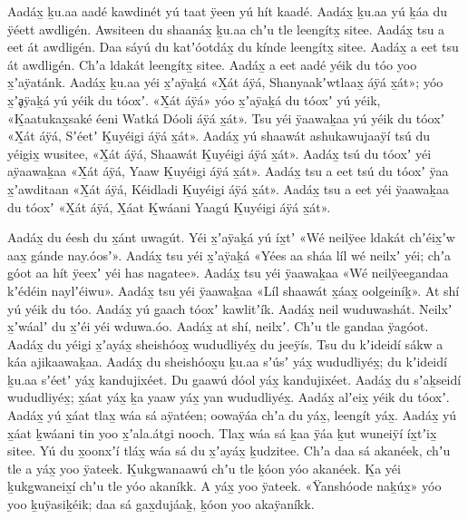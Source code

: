 \begin{pairs}
\begin{Leftside}
\pstart
{}Aadáx̱ ḵu.aa aadé kawdinét yú taat ÿeen yú hít kaadé.
\hspace{-0.5ex}Aadáx̱ ḵu.aa yú ḵáa du ÿéett aw\-dlig̱én.
\hspace{-0.5ex}Awsiteen du shaanáx̱ ḵu.aa chʼu tle leengítx̱ sitee.
\hspace{-0.5ex}Aadáx̱ tsu a eet át awdli\-g̱én.
Daa sáyú du katʼóotdáx̱ du kínde leen\-gítx̱ sitee.
Aadáx̱ a eet tsu át awdlig̱én.
\:Chʼa ldakát leengítx̱ sitee.
Aadáx̱ a eet aadé yéik du tóo yoo x̱ʼaÿatánk.
\hspace{-1ex}Aadáx̱ ḵu.aa yéi x̱ʼaÿaḵá
«\!X̱át áÿá, Shanyaakʼwtlaax̱ áÿá x̱át\!»;
yóo x̱ʼḁÿaḵá yú yéik du tóoxʼ.
«\!X̱át áÿá\!» yóo x̱ʼaÿaḵá du tóoxʼ yú yéik,
«\!Ḵaatu\-kax̱saké éeni Watká Dóoli áÿá x̱át\!».
Tsu yéi ÿaawaḵaa yú yéik du tóoxʼ
«\!X̱át áÿá, Sʼéetʼ Ḵuyéigi áÿá x̱át\!».
Aadáx̱ yú shaawát ashukawujaaÿí tsú du yéigix̱ wusitee,
«\!X̱át áÿá, Shaawát Ḵuyéigi áÿá x̱át\!».
Aadáx̱ tsú du tóoxʼ yéi aÿaawaḵaa
«\!X̱át áÿá, Yaaw Ḵuyéigi áÿá x̱át\!».
Aadáx̱ tsu a eet tsú du tóoxʼ ÿaa x̱ʼawditaan
«\!X̱át áÿá, Kéidladi Ḵuyéigi áÿá x̱át\!».
Aadáx̱ tsu a eet yéi ÿaawa\-ḵaa du tóoxʼ
«\!X̱át áÿá, X̱áat Ḵwáani Yaagú Ḵuyéigi áÿá x̱át\!».
\pend

\pstart
{}Aadáx̱ du éesh du x̱ánt uwagút.
Yéi x̱ʼaÿaḵá yú íx̱tʼ
«\!Wé neilÿee ldakát chʼéix̱ʼw aax̱ gánde nay.óosʼ\!».
Aadáx̱ tsu yéi x̱ʼaÿaḵá
«\!Yées aa sháa líl wé neilxʼ yéi;
chʼa g̱óot aa hít ÿeexʼ yéi has nag̱atee\!».
Aadáx̱ tsu yéi ÿaawaḵaa
«\!Wé neilÿeegandaa kʼédéin naylʼéiwu\!».
Aadáx̱ tsu yéi ÿaawaḵaa
«\!Líl shaawát x̱áax̱ oolg̱einíḵ\!».
At shí yú yéik du tóo.
Aadáx̱ yú g̱aach tóoxʼ kawlitʼík.
Aadáx̱ neil wuduwashát.
Neilxʼ x̱ʼwáalʼ du x̱ʼéi yéi wduwa.óo.
Aadáx̱ at shí, neilxʼ.
Chʼu tle gandaa ÿagóot.
Aadáx̱ du yéigi x̱ʼayáx̱ sheishóox̱ wududliyéx̱ du jeeÿís.
Tsu du kʼideidí sákw a káa ajikaawaḵaa.
Aa\-dáx̱ du sheishóox̱u ḵu.aa sʼúsʼ yáx̱ wududli\-yéx̱;
du kʼideidí ḵu.aa sʼéetʼ yáx̱ kandujixéet.
Du gaawú dóol yáx̱ kandujixéet.
Aadáx̱ du sʼaḵseidí wududliyéx̱;
x̱áat yáx̱ ḵa yaaw yáx̱ yan wududliyéx̱.
Aadáx̱ alʼeix̱ yéik du tóoxʼ.
Aadáx̱ yú x̱áat tlax̱ wáa sá aÿatéen;
oowaÿáa chʼa du yáx̱, leengít yáx̱.
Aa\-dáx̱ yú x̱áat ḵwáani tin yoo x̱ʼala.átgi nooch.
Tlax̱ wáa sá ḵaa ÿáa ḵut wuneiÿí íx̱tʼix̱ sitee.
Yú du x̱oonxʼí tláx̱ wáa sá du x̱ʼayáx̱ ḵudzitee.
Chʼa daa sá akanéek, chʼu tle a yáx̱ yoo ÿateek.
Ḵukg̱wanaawú chʼu tle ḵóon yóo akanéek.
Ḵa yéi ḵukg̱waneix̱í chʼu tle yóo akaníkk.
A yáx̱ yoo ÿateek.
«\!Ÿanshóode naḵúx̱\!» yóo yoo ḵuÿasiḵéik;
daa sá gax̱dujáaḵ, ḵóon yoo akaÿaníkk.
\pend


\end{Leftside}
\end{pairs}
